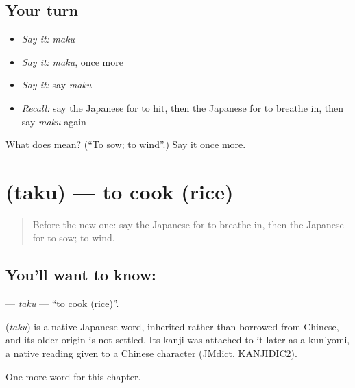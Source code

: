 \subsection*{Your turn}
\begin{itemize}
\raggedright
  \item \emph{Say it:} \emph{maku}
  \item \emph{Say it:} \emph{maku}, once more
  \item \emph{Say it:} say \emph{maku}
  \item \emph{Recall:} say the Japanese for to hit, then the Japanese for to breathe in, then say \emph{maku} again
\end{itemize}

\begin{tcolorbox}[breakable,colback=teal!4,colframe=teal!35!black,title={Before you move on}]
What does  mean? (\textquotedblleft{}To sow; to wind\textquotedblright{}.) Say it once more.
\end{tcolorbox}
\section[\texorpdfstring{\ja{たく} (taku)}{たく (taku)}]{ (taku) — to cook (rice)}

\label{lesson:JA-C85-taku}



\begin{quote}
Before the new one: say the Japanese for to breathe in, then the Japanese for to sow; to wind.
\end{quote}

\subsection*{You'll want to know: }
\textbf{} — \emph{taku} — \textquotedblleft{}to cook (rice)\textquotedblright{}.

\begin{cousinweb}
\textbf{} (\emph{taku}) is a native Japanese word, inherited rather than borrowed from Chinese, and its older origin is not settled. Its kanji was attached to it later as a kun'yomi, a native reading given to a Chinese character (JMdict, KANJIDIC2).
\end{cousinweb}

\begin{grammarlens}[title={What you've built}]
One more word for this chapter.
\end{grammarlens}

